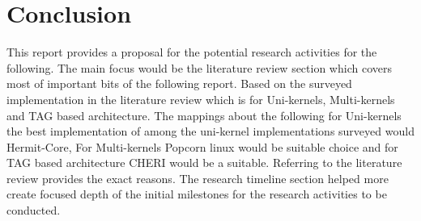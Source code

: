 
\chapter{Conclusion}  %
This report provides a proposal for the potential research 
activities for the following. The main focus would be 
the literature review section which covers most of important 
bits of the following report. Based on the surveyed implementation 
in the literature review which is for Uni-kernels, Multi-kernels 
and TAG based architecture. The mappings about the following 
for Uni-kernels the best implementation of among the uni-kernel 
implementations surveyed would Hermit-Core, For Multi-kernels 
Popcorn linux would be suitable choice and for TAG based architecture
CHERI would be a suitable. Referring to the literature review 
provides the exact reasons. The research timeline section helped
more create focused depth of the initial milestones for the research 
activities to be conducted.